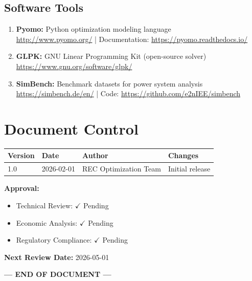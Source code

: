 \documentclass[11pt,a4paper]{article}
\begin{document}
\subsection{Software Tools}

\begin{enumerate}
    \item \textbf{Pyomo:} Python optimization modeling language \\
    \href{http://www.pyomo.org/}{http://www.pyomo.org/} | Documentation: \href{https://pyomo.readthedocs.io/}{https://pyomo.readthedocs.io/}
    
    \item \textbf{GLPK:} GNU Linear Programming Kit (open-source solver) \\
    \href{https://www.gnu.org/software/glpk/}{https://www.gnu.org/software/glpk/}
    
    \item \textbf{SimBench:} Benchmark datasets for power system analysis \\
    \href{https://simbench.de/en/}{https://simbench.de/en/} | Code: \href{https://github.com/e2nIEE/simbench}{https://github.com/e2nIEE/simbench}
\end{enumerate}

\section*{Document Control}

\begin{table}[h]
\centering
\begin{tabular}{@{}llll@{}}
\toprule
\textbf{Version} & \textbf{Date} & \textbf{Author} & \textbf{Changes} \\ 
\midrule
1.0 & 2026-02-01 & REC Optimization Team & Initial release \\
\bottomrule
\end{tabular}
\end{table}

\textbf{Approval:}
\begin{itemize}
    \item Technical Review: $\checkmark$ Pending
    \item Economic Analysis: $\checkmark$ Pending
    \item Regulatory Compliance: $\checkmark$ Pending
\end{itemize}

\textbf{Next Review Date:} 2026-05-01

\vspace{1cm}
\begin{center}
\textbf{--- END OF DOCUMENT ---}
\end{center}
\end{document}
